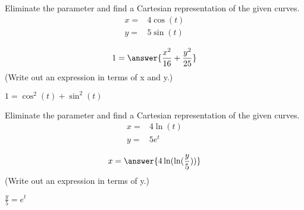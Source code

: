 \documentclass{ximera}
\author{Nicholas Hemleben}
\begin{document}






\begin{exercise}
Eliminate the parameter and find a Cartesian representation of the given curves.
\begin{align*}
x= &  4 \cos (t) \\
y= &  5 \sin (t)
\end{align*}

\[
1= \answer{ \frac {x^2}{16} + \frac{y^2} {25}}
\]
(Write out an expression in terms of x and y.)

\begin{hint}
$1 = \cos^2(t) + \sin^2 (t) $
\end{hint}
\end{exercise}

\begin{exercise}
Eliminate the parameter and find a Cartesian representation of the given curves.
\begin{align*}
x= &  4 \ln (t) \\
y= &  5 e^t
\end{align*}

\[
x = \answer{ 4 \ln (\ln( \frac y 5))}
\]
(Write out an expression in terms of y.)

\begin{hint}
$\frac y 5 = e^t$
\end{hint}
\end{exercise}

\end{document}
